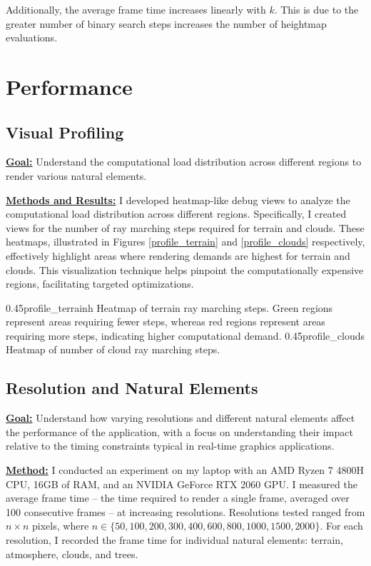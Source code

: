 Additionally, the average frame time increases linearly with $k$. This is due to the greater number of binary search steps increases the number of heightmap evaluations.




\section{Performance}
\label{Performance}

\subsection{Visual Profiling}

\textbf{\underline{Goal:}}
Understand the computational load distribution across different regions to render various natural elements.

\textbf{\underline{Methods and Results:}}
I developed heatmap-like debug views to analyze the computational load distribution across different regions. Specifically, I created views for the number of ray marching steps required for terrain and clouds. These heatmaps, illustrated in Figures \ref{profile_terrain} and \ref{profile_clouds} respectively, effectively highlight areas where rendering demands are highest for terrain and clouds. This visualization technique helps pinpoint the computationally expensive regions, facilitating targeted optimizations.

\myfigurerow
{0.45}{profile_terrain}{h}
{Heatmap of terrain ray marching steps. Green regions represent areas requiring fewer steps, whereas red regions represent areas requiring more steps, indicating higher computational demand.}
{0.45}{profile_clouds}
{Heatmap of number of cloud ray marching steps.}


\subsection{Resolution and Natural Elements}

\textbf{\underline{Goal:}} 
Understand how varying resolutions and different natural elements affect the performance of the application, with a focus on understanding their impact relative to the timing constraints typical in real-time graphics applications.

\textbf{\underline{Method:}}
I conducted an experiment on my laptop with an AMD Ryzen 7 4800H CPU, 16GB of RAM, and an NVIDIA GeForce RTX 2060 GPU. I measured the average frame time -- the time required to render a single frame, averaged over 100 consecutive frames -- at increasing resolutions. Resolutions tested ranged from $n \times n$ pixels, where $n \in \{50, 100, 200, 300, 400, 600, 800, 1000, 1500, 2000\}$. For each resolution, I recorded the frame time for individual natural elements: terrain, atmosphere, clouds, and trees.


